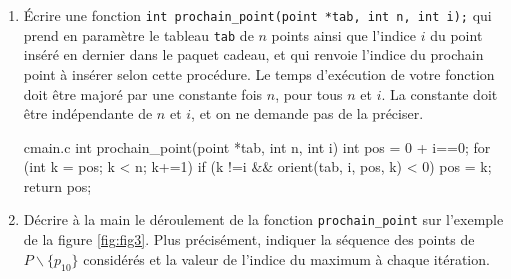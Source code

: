 \documentclass[a4paper,french,bookmarks]{article}
\begin{document}
\begin{enumerate}[resume]
{        La relation binaire $\preccurlyeq$ est réfléxive, antisymétrique et transtitive donc c'est une relation d'ordre.
        
        Par ailleurs, $j \not\preccurlyeq k \implies \texttt{orient(tab, i, j, k)} > 0 \implies \texttt{orient(tab, i, k, j)} < 0 \implies k \preccurlyeq j$ donc .
    }
    
    \item Écrire une fonction \verb|int prochain_point(point *tab, int n, int i);| qui prend en paramètre le tableau \verb|tab| de $n$ points ainsi que l’indice $i$ du point inséré en dernier dans le paquet cadeau, et qui renvoie l’indice du prochain point à insérer selon cette procédure. Le temps d’exécution de votre fonction doit être majoré par une constante fois $n$, pour tous $n$ et $i$. La constante doit être indépendante de $n$ et $i$, et on ne demande pas de la préciser.
    
    \begin{code}{c}{main.c}
int prochain_point(point *tab, int n, int i) {
    int pos = 0 + i==0;
    for (int k = pos; k < n; k+=1)
        if (k !=i && orient(tab, i, pos, k) < 0) pos = k;
    return pos;
}
    \end{code}
    
    \item Décrire à la main le déroulement de la fonction \verb|prochain_point| sur l’exemple de la figure \ref{fig:fig3}. Plus précisément, indiquer la séquence des points de $P\backslash\{p_{10}\}$ considérés et la valeur de l’indice du maximum à chaque itération.
    
\end{enumerate}
\end{document}

